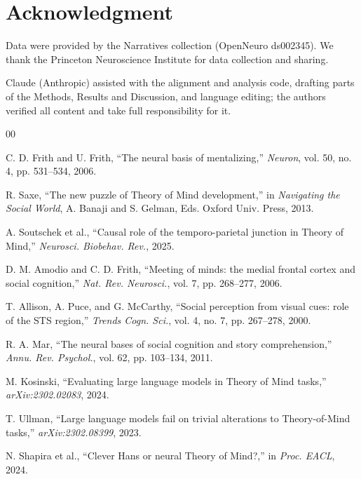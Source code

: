 \documentclass[conference]{IEEEtran}
\begin{document}
\section*{Acknowledgment}

Data were provided by the Narratives collection \cite{nastase2021narratives} (OpenNeuro ds002345). We thank the Princeton Neuroscience Institute for data collection and sharing.

Claude (Anthropic) assisted with the alignment and analysis code, drafting parts of the Methods, Results and Discussion, and language editing; the authors verified all content and take full responsibility for it.

\begin{thebibliography}{00}

 C. D. Frith and U. Frith, ``The neural basis of mentalizing,'' \textit{Neuron}, vol. 50, no. 4, pp. 531--534, 2006.

 R. Saxe, ``The new puzzle of Theory of Mind development,'' in \textit{Navigating the Social World}, A. Banaji and S. Gelman, Eds. Oxford Univ. Press, 2013.

 A. Soutschek et al., ``Causal role of the temporo-parietal junction in Theory of Mind,'' \textit{Neurosci. Biobehav. Rev.}, 2025.

 D. M. Amodio and C. D. Frith, ``Meeting of minds: the medial frontal cortex and social cognition,'' \textit{Nat. Rev. Neurosci.}, vol. 7, pp. 268--277, 2006.

 T. Allison, A. Puce, and G. McCarthy, ``Social perception from visual cues: role of the STS region,'' \textit{Trends Cogn. Sci.}, vol. 4, no. 7, pp. 267--278, 2000.

 R. A. Mar, ``The neural bases of social cognition and story comprehension,'' \textit{Annu. Rev. Psychol.}, vol. 62, pp. 103--134, 2011.

 M. Kosinski, ``Evaluating large language models in Theory of Mind tasks,'' \textit{arXiv:2302.02083}, 2024.

 T. Ullman, ``Large language models fail on trivial alterations to Theory-of-Mind tasks,'' \textit{arXiv:2302.08399}, 2023.

 N. Shapira et al., ``Clever Hans or neural Theory of Mind?,'' in \textit{Proc. EACL}, 2024.


\end{thebibliography}
\end{document}

